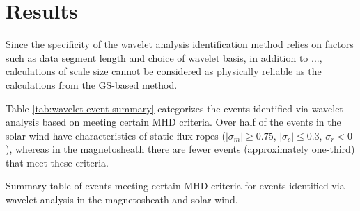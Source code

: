 \section{Results}
Since the specificity of the wavelet analysis identification method relies on factors such as data segment length and choice of wavelet basis, in addition to ..., calculations of scale size cannot be considered as physically reliable as the calculations from the GS-based method.


Table \ref{tab:wavelet-event-summary} categorizes the events identified via wavelet analysis based on meeting certain MHD criteria. Over half of the events in the solar wind have characteristics of static flux ropes ($|\sigma_m|\geq 0.75$, $|\sigma_c|\leq 0.3$, $\sigma_r<0$), whereas in the magnetosheath there are fewer events (approximately one-third) that meet these criteria.

\begin{table}[h]
    \centering
    
    \caption{Summary table of events meeting certain MHD criteria for events identified via wavelet analysis in the magnetosheath and solar wind.}
\end{table}
